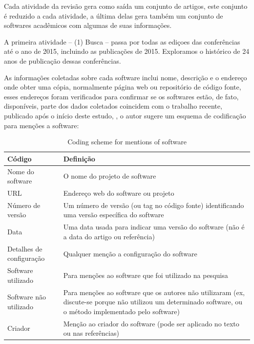 Cada atividade da revisão gera como saída um conjunto de artigos, este conjunto
é reduzido a cada atividade, a última delas gera também um conjunto de
softwares acadêmicos com algumas de suas informações.

A primeira atividade -- (1) Busca -- passa por todas as ediçoes das
conferências até o ano de 2015, incluindo as publicações de 2015.  Exploramos o
histórico de 24 anos de publicação dessas conferências.

As informações coletadas sobre cada software inclui nome, descrição e o
endereço onde obter uma cópia, normalmente página web ou repositório de código
fonte, esses endereços foram verificados para confirmar se os softwares estão,
de fato, disponíveis, parte dos dados coletados coincidem com o trabalho
recente, publicado após o início deste estudo, \cite{howison2016software}, o
autor sugere um esquema de codificação para menções a software:

\begin{table}[h]
\caption{Coding scheme for mentions of software \cite{howison2016software}}
\centering
\begin{tabular}{ l p{8cm} }
  \hline
  Código                   & Definição \\
  \hline
  Nome do software         & O nome do projeto de software \\
  URL                      & Endereço web do software ou projeto \\
  Número de versão         & Um número de versão (ou tag no código fonte) identificando uma versão específica do software \\
  Data                     & Uma data usada para indicar uma versão do software (não é a data do artigo ou referência) \\
  Detalhes de configuração & Qualquer menção a configuração do software \\
  Software utilizado       & Para menções ao software que foi utilizado na pesquisa \\
  Software não utilizado   & Para menções ao software que os autores não utilizaram (ex, discute-se porque não utilizou um determinado software, ou o método implementado pelo software) \\
  Criador                  & Menção ao criador do software (pode ser aplicado no texto ou nas referências) \\
  \hline
\end{tabular}
\label{coding-scheme-mentions}
\end{table}

